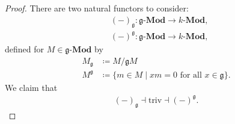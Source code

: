 \begin{proof}
  There are two natural functors to consider:
  \begin{align*}
    &(-)_{\mathfrak{g}}: \mathfrak{g}\text{-}\mathbf{Mod} \to k\text{-}\mathbf{Mod}, \\
    &(-)^{\mathfrak{g}}: \mathfrak{g}\text{-}\mathbf{Mod} \to k\text{-}\mathbf{Mod},
  \end{align*}
  defined for $ M \in \mathfrak{g}\text{-}\mathbf{Mod} $ by
  \begin{align*}
    M_{\mathfrak{g}} &\coloneqq M/\mathfrak{g}M \\
    M^\mathfrak{g} &\coloneqq \{m \in M \mid xm=0 \text{ for all } x \in \mathfrak{g}\}
  .\end{align*}
  We claim that
  \begin{align*}
    (-)_{\mathfrak{g}} \dashv \text{triv} \dashv (-)^\mathfrak{g}
  .\end{align*}


\end{proof}
